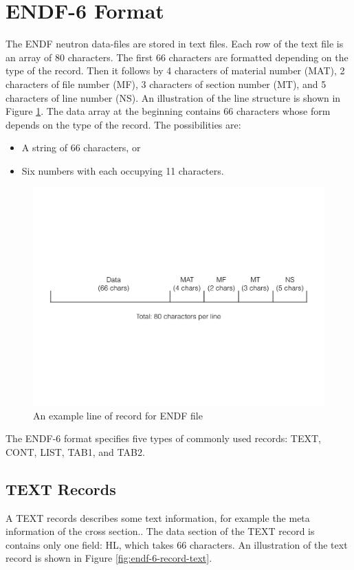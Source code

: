 \section{ENDF-6 Format}
The ENDF neutron data-files are stored in text files. Each row of the text file is an array of 80 characters. The first 66 characters are formatted depending on the type of the record. Then it follows by 4 characters of material number (MAT), 2 characters of file number (MF), 3 characters of section number (MT), and 5 characters of line number (NS). An illustration of the line structure is shown in Figure \ref{fig:endf-6-record}. The data array at the beginning contains 66 characters whose form depends on the type of the record.  The possibilities are:

\begin{itemize}
\item A string of 66 characters, or
\item Six numbers with each occupying 11 characters.
\end{itemize}

\begin{figure}[h]
\begin{center}
\includegraphics[scale=0.4]{./pics/endf-6-record.pdf}
\end{center}
\caption{ \label{fig:endf-6-record}
An example line of record for ENDF file}
\end{figure}

The ENDF-6 format specifies five types of commonly used records: TEXT, CONT, LIST, TAB1, and TAB2. 

\subsection{TEXT Records}
A TEXT records describes some text information, for example the meta information of the cross section.. The data section of the TEXT record is contains only one field: HL, which takes 66 characters. An illustration of the text record is shown in Figure \ref{fig:endf-6-record-text}.

